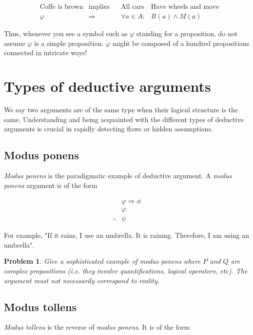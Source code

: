 \documentclass[a4paper, 12pt]{article}
\newtheorem{problem}{Problem}
\newtheorem{problem}{Problem}
\begin{document}
\begin{align*}
    &\text{Coffe is brown}&\text{implies} &~ ~ ~ ~ \text{All cars}&\text{Have wheels and move}\\
    &\varphi &\Rightarrow  &~ ~ ~ ~ \forall a \in A : &R(a) \land M(a)
\end{align*}

Thus, whenever you see a symbol such as $\varphi$ standing for a proposition,
do not assume $\varphi$ is a simple proposition. $\varphi$ might be composed of
a hundred propositions connected in intricate ways!

\section{Types of deductive arguments}

We say two arguments are of the same type when their logical structure is the
same. Understanding and being acquainted with the different types of deductive
arguments is crucial in rapidly detecting flaws or hidden assumptions.

\subsection{Modus ponens}

\textit{Modus ponens} is the paradigmatic example of deductive argument. A \textit{modus ponens}
argument is of the form 

\begin{align*}
    &\varphi \Rightarrow \phi \\ 
    &\varphi \\ 
   \therefore  & \psi
\end{align*}

For example, "If it rains, I use an umbrella. It is raining. Therefore, I am using an umbrella". 

\begin{problem}
    Give a sophisticated example of \textit{modus ponens} where $P$ and $Q$ are complex propositions 
    (i.e. they involve quantifications, logical operators, etc). The argument must not 
    necessarily correspond to reality.
\end{problem}

\subsection{Modus tollens}

\textit{Modus tollens} is the reverse of \textit{modus ponens}. It is of the form 
\end{document}

